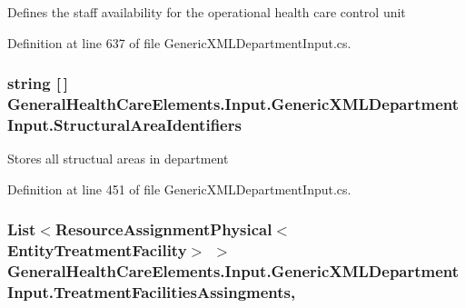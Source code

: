 Defines the staff availability for the operational health care control unit 



Definition at line 637 of file Generic\+X\+M\+L\+Department\+Input.\+cs.

\subsubsection[{\texorpdfstring{Structural\+Area\+Identifiers}{StructuralAreaIdentifiers}}]{\setlength{\rightskip}{0pt plus 5cm}string \mbox{[}$\,$\mbox{]} General\+Health\+Care\+Elements.\+Input.\+Generic\+X\+M\+L\+Department\+Input.\+Structural\+Area\+Identifiers\hspace{0.3cm}{\ttfamily [get]}}\hypertarget{class_general_health_care_elements_1_1_input_1_1_generic_x_m_l_department_input_a73d6e710fe47f71a1b99810d7fdefd30}{}\label{class_general_health_care_elements_1_1_input_1_1_generic_x_m_l_department_input_a73d6e710fe47f71a1b99810d7fdefd30}


Stores all structual areas in department 



Definition at line 451 of file Generic\+X\+M\+L\+Department\+Input.\+cs.

\subsubsection[{\texorpdfstring{Treatment\+Facilities\+Assingments}{TreatmentFacilitiesAssingments}}]{\setlength{\rightskip}{0pt plus 5cm}List$<${\bf Resource\+Assignment\+Physical}$<${\bf Entity\+Treatment\+Facility}$>$ $>$ General\+Health\+Care\+Elements.\+Input.\+Generic\+X\+M\+L\+Department\+Input.\+Treatment\+Facilities\+Assingments\hspace{0.3cm}{\ttfamily [get]}, {\ttfamily [set]}}\hypertarget{class_general_health_care_elements_1_1_input_1_1_generic_x_m_l_department_input_ad6ffebd2d49d7c1b5af2602b48a92608}{}\label{class_general_health_care_elements_1_1_input_1_1_generic_x_m_l_department_input_ad6ffebd2d49d7c1b5af2602b48a92608}



